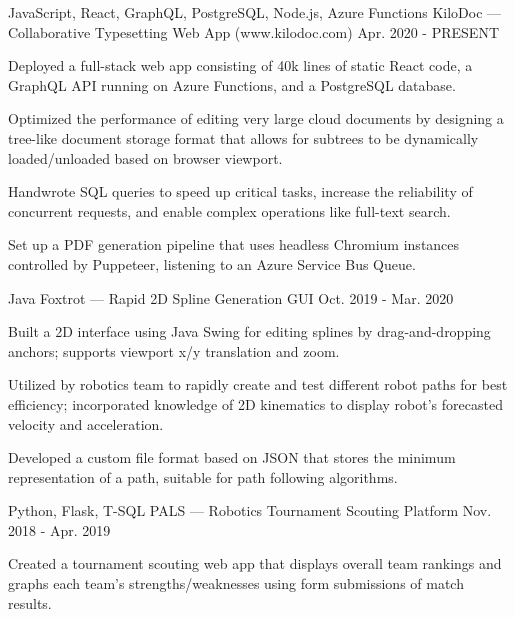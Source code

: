 
\begin{cventries}
  \cventry
  {JavaScript, React, GraphQL, PostgreSQL, Node.js, Azure Functions} %
  {KiloDoc --- Collaborative Typesetting Web App (www.kilodoc.com)} %
  {} %
  {Apr. 2020 - PRESENT} %
  {
    \begin{cvitems} %
      \item {Deployed a full-stack web app consisting of 40k lines of static React code, a GraphQL API running on Azure Functions, and a PostgreSQL database.}
      \item {Optimized the performance of editing very large cloud documents by designing a tree-like document storage format that allows for subtrees to be dynamically loaded/unloaded based on browser viewport.}
      \item {Handwrote SQL queries to speed up critical tasks, increase the reliability of concurrent requests, and enable complex operations like full-text search.}
      \item {Set up a PDF generation pipeline that uses headless Chromium instances controlled by Puppeteer, listening to an Azure Service Bus Queue.}
    \end{cvitems}
  }

  \cventry
  {Java} %
  {Foxtrot --- Rapid 2D Spline Generation GUI} %
  {} %
  {Oct. 2019 - Mar. 2020} %
  {
    \begin{cvitems} %
      \item {Built a 2D interface using Java Swing for editing splines by drag-and-dropping anchors; supports viewport x/y translation and zoom.}
      \item {Utilized by robotics team to rapidly create and test different robot paths for best efficiency; incorporated knowledge of 2D kinematics to display robot's forecasted velocity and acceleration.}
      \item {Developed a custom file format based on JSON that stores the minimum representation of a path, suitable for path following algorithms.}
    \end{cvitems}
  }

  \cventry
  {Python, Flask, T-SQL} %
  {PALS --- Robotics Tournament Scouting Platform} %
  {} %
  {Nov. 2018 - Apr. 2019} %
  {
    \begin{cvitems} %
      \item {Created a tournament scouting web app that displays overall team rankings and graphs each team's strengths/weaknesses using form submissions of match results.}
    \end{cvitems}
  }
\end{cventries}
